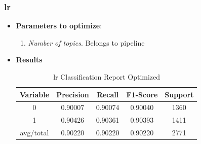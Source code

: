 \subsubsection{\acl{lr}}
\begin{itemize}
	\item \textbf{Parameters to optimize}:
	\begin{enumerate}
		\item \textit{Number of topics}. Belongs to pipeline
	\end{enumerate}
	\item \textbf{Results}
	\begin{table}[h!]
		\centering
		\begin{tabular}{||c c c c c||} 
			\hline
			Variable & Precision & Recall & F1-Score & Support \\ [0.5ex] 
			\hline\hline
			0 & 0.90007 & 0.90074 & 0.90040 & 1360 \\ 
			1 & 0.90426 & 0.90361 & 0.90393 & 1411 \\
			avg/total & 0.90220 & 0.90220 & 0.90220 & 2771 \\
			[1ex] 
			\hline
		\end{tabular}
		\caption{\acl{lr} Classification Report Optimized}
		\label{tab:lr2}
	\end{table}
	
\end{itemize}




